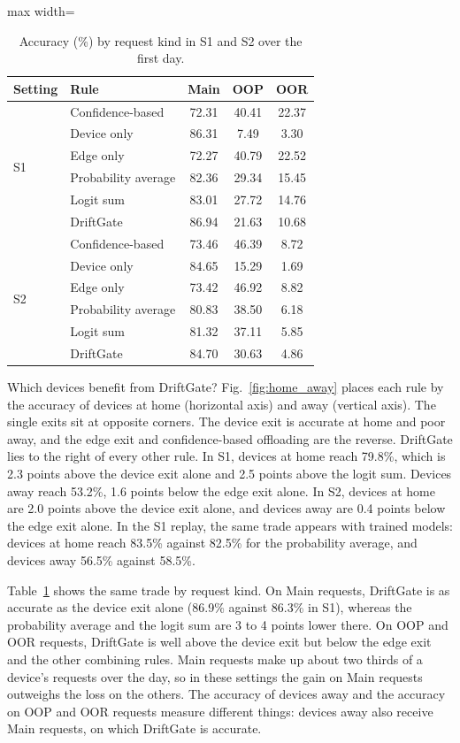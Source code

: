 \begin{table}[t]
\centering
\caption{Accuracy (\%) by request kind in S1 and S2 over the first day.}
\label{tab:kinds}
\begin{adjustbox}{max width=\columnwidth}
\begin{tabular}{llccc}
\toprule
Setting & Rule & Main & OOP & OOR \\
\midrule
\multirow{6}{*}{S1} & Confidence-based & 72.31 & 40.41 & 22.37 \\
 & Device only & 86.31 & 7.49 & 3.30 \\
 & Edge only & 72.27 & 40.79 & 22.52 \\
 & Probability average & 82.36 & 29.34 & 15.45 \\
 & Logit sum & 83.01 & 27.72 & 14.76 \\
 & DriftGate & 86.94 & 21.63 & 10.68 \\
\midrule
\multirow{6}{*}{S2} & Confidence-based & 73.46 & 46.39 & 8.72 \\
 & Device only & 84.65 & 15.29 & 1.69 \\
 & Edge only & 73.42 & 46.92 & 8.82 \\
 & Probability average & 80.83 & 38.50 & 6.18 \\
 & Logit sum & 81.32 & 37.11 & 5.85 \\
 & DriftGate & 84.70 & 30.63 & 4.86 \\
\bottomrule
\end{tabular}
\end{adjustbox}
\end{table}

Which devices benefit from DriftGate? Fig.~\ref{fig:home_away} places each rule by the accuracy of devices at home (horizontal axis) and away (vertical axis). The single exits sit at opposite corners. The device exit is accurate at home and poor away, and the edge exit and confidence-based offloading are the reverse. DriftGate lies to the right of every other rule. In S1, devices at home reach 79.8\%, which is 2.3 points above the device exit alone and 2.5 points above the logit sum. Devices away reach 53.2\%, 1.6 points below the edge exit alone. In S2, devices at home are 2.0 points above the device exit alone, and devices away are 0.4 points below the edge exit alone. In the S1 replay, the same trade appears with trained models: devices at home reach 83.5\% against 82.5\% for the probability average, and devices away 56.5\% against 58.5\%.

Table~\ref{tab:kinds} shows the same trade by request kind. On Main requests, DriftGate is as accurate as the device exit alone (86.9\% against 86.3\% in S1), whereas the probability average and the logit sum are 3 to 4 points lower there. On OOP and OOR requests, DriftGate is well above the device exit but below the edge exit and the other combining rules. Main requests make up about two thirds of a device's requests over the day, so in these settings the gain on Main requests outweighs the loss on the others. The accuracy of devices away and the accuracy on OOP and OOR requests measure different things: devices away also receive Main requests, on which DriftGate is accurate.

